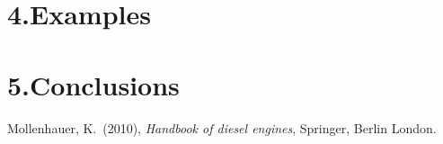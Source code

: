 \documentclass[9pt]{report}
\begin{document}
\section{4.\hspace*{0.5em}Examples}\label{sec-examples}%

\section{5.\hspace*{0.5em}Conclusions}\label{sec-conclusions}%

{\mdsupressbiblabel{}\begin{thebibliography}{1}%
\label{sec-bibliography}%

\mdbibitemlabel{}Mollenhauer, K.~(2010), \emph{Handbook of diesel engines}, Springer, Berlin London.\label{mollenhauer2010handbook}%
\par%
\end{thebibliography}}%
\end{document}
